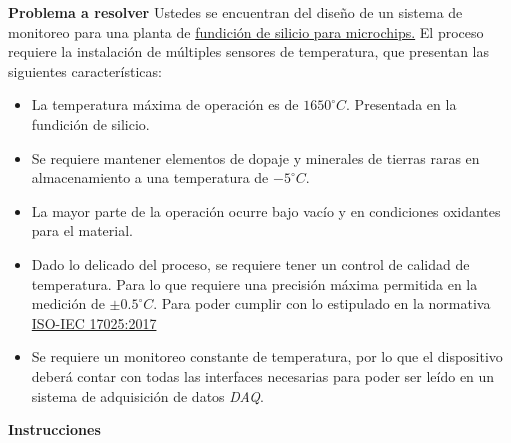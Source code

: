 \documentclass[12pt]{article}
\begin{document}
\setlength{\parindent}{0em}

\noindent\textbf{Problema a resolver}
\newline
\newline
Ustedes se encuentran del diseño de un sistema de monitoreo para una planta de \href{https://www.youtube.com/watch?v=oPHlnLcOxyM&ab_channel=JoseViFerrer}{fundición de silicio para microchips.} El proceso requiere la instalación de múltiples sensores de temperatura, que presentan las siguientes características: 
\begin{itemize}
    \item La temperatura máxima de operación es de $1650 ^{\circ} C$. Presentada en la fundición de silicio. 
    \item Se requiere mantener elementos de dopaje y minerales de tierras raras en almacenamiento a una temperatura de $-5 ^{\circ} C$.
    \item La mayor parte de la operación ocurre bajo vacío y en condiciones oxidantes para el material. 
    \item Dado lo delicado del proceso, se requiere tener un control de calidad de temperatura. Para lo que requiere una precisión máxima permitida en la medición de $\pm 0.5 ^{\circ} C $. Para poder cumplir con lo estipulado en la normativa \href{https://www.iso.org/obp/ui/#iso:std:iso-iec:17025:ed-3:v2:es}{ISO-IEC 17025:2017} 
    \item Se requiere un monitoreo constante de temperatura, por lo que el dispositivo deberá contar con todas las interfaces necesarias para poder ser leído en un sistema de adquisición de datos \textit{DAQ}.
\end{itemize}

\noindent\textbf{Instrucciones}
\newline
\end{document}
